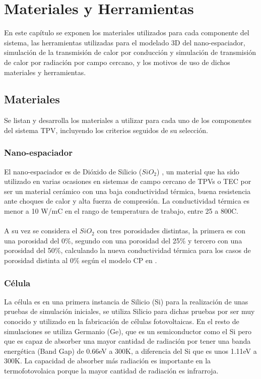 \chapter{Materiales y Herramientas}
En este capítulo se exponen los materiales utilizados para cada componente del sistema, las herramientas utilizadas para el modelado 3D del nano-espaciador, simulación de la transmisión de calor por conducción y simulación de transmisión de calor por radiación por campo cercano, y los motivos de uso de dichos materiales y herramientas.
\section{Materiales}
Se listan y desarrolla los materiales a utilizar para cada uno de los componentes del sistema TPV, incluyendo los criterios seguidos de su selección.
\subsection{Nano-espaciador}
El nano-espaciador es de Dióxido de Silicio ($SiO_2$) \cite{doi:10.1063/1.1141498}, un material que ha sido utilizado en varias ocasiones en sistemas de campo cercano de TPVs o TEC por ser un material cerámico con una baja conductividad térmica, buena resistencia ante choques de calor y alta fuerza de compresión. La conductividad térmica es menor a 10 W/m\textdegree C en el rango de temperatura de trabajo, entre 25 a 800\textdegree C.\\\\
A su vez se considera el $SiO_2$ con tres porosidades distintas, la primera es con una porosidad del 0\%, segundo con una porosidad del 25\% y tercero con una porosidad del 50\%, calculando la nueva conductividad térmica para los casos de porosidad distinta al 0\% según el modelo CP en \cite{ThermalConductivity_SiO2_2018}.

\subsection{Célula}
La célula es en una primera instancia de Silicio (Si) para la realización de unas pruebas de simulación iniciales, se utiliza Silicio para dichas pruebas por ser muy conocido y utilizado en la fabricación de células fotovoltaicas. En el resto de simulaciones se utiliza Germanio (Ge), que es un semiconductor como el Si pero que es capaz de absorber una mayor cantidad de radiación por tener una banda energética (Band Gap) de 0.66eV a 300K, a diferencia del Si que es unos 1.11eV a 300K. La capacidad de absorber más radiación es importante en la termofotovolaica porque la mayor cantidad de radiación es infrarroja.\\

